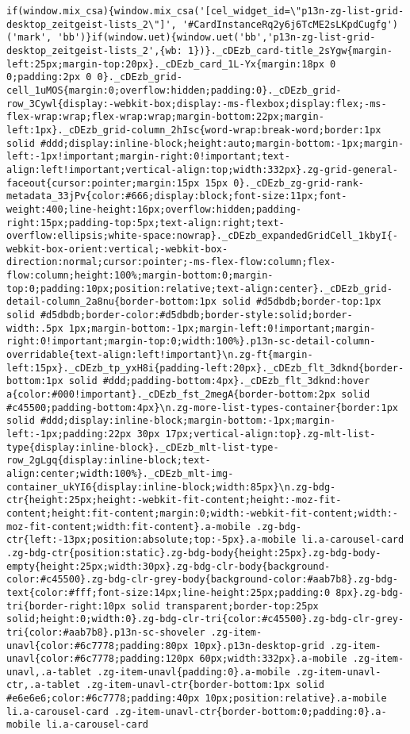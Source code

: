 \documentclass[
]{article}
\begin{document}
\begin{verbatim}
if(window.mix_csa){window.mix_csa('[cel_widget_id=\"p13n-zg-list-grid-desktop_zeitgeist-lists_2\"]', '#CardInstanceRq2y6j6TcME2sLKpdCugfg')('mark', 'bb')}if(window.uet){window.uet('bb','p13n-zg-list-grid-desktop_zeitgeist-lists_2',{wb: 1})}._cDEzb_card-title_2sYgw{margin-left:25px;margin-top:20px}._cDEzb_card_1L-Yx{margin:18px 0 0;padding:2px 0 0}._cDEzb_grid-cell_1uMOS{margin:0;overflow:hidden;padding:0}._cDEzb_grid-row_3Cywl{display:-webkit-box;display:-ms-flexbox;display:flex;-ms-flex-wrap:wrap;flex-wrap:wrap;margin-bottom:22px;margin-left:1px}._cDEzb_grid-column_2hIsc{word-wrap:break-word;border:1px solid #ddd;display:inline-block;height:auto;margin-bottom:-1px;margin-left:-1px!important;margin-right:0!important;text-align:left!important;vertical-align:top;width:332px}.zg-grid-general-faceout{cursor:pointer;margin:15px 15px 0}._cDEzb_zg-grid-rank-metadata_33jPv{color:#666;display:block;font-size:11px;font-weight:400;line-height:16px;overflow:hidden;padding-right:15px;padding-top:5px;text-align:right;text-overflow:ellipsis;white-space:nowrap}._cDEzb_expandedGridCell_1kbyI{-webkit-box-orient:vertical;-webkit-box-direction:normal;cursor:pointer;-ms-flex-flow:column;flex-flow:column;height:100%;margin-bottom:0;margin-top:0;padding:10px;position:relative;text-align:center}._cDEzb_grid-detail-column_2a8nu{border-bottom:1px solid #d5dbdb;border-top:1px solid #d5dbdb;border-color:#d5dbdb;border-style:solid;border-width:.5px 1px;margin-bottom:-1px;margin-left:0!important;margin-right:0!important;margin-top:0;width:100%}.p13n-sc-detail-column-overridable{text-align:left!important}\n.zg-ft{margin-left:15px}._cDEzb_tp_yxH8i{padding-left:20px}._cDEzb_flt_3dknd{border-bottom:1px solid #ddd;padding-bottom:4px}._cDEzb_flt_3dknd:hover a{color:#000!important}._cDEzb_fst_2megA{border-bottom:2px solid #c45500;padding-bottom:4px}\n.zg-more-list-types-container{border:1px solid #ddd;display:inline-block;margin-bottom:-1px;margin-left:-1px;padding:22px 30px 17px;vertical-align:top}.zg-mlt-list-type{display:inline-block}._cDEzb_mlt-list-type-row_2gLgq{display:inline-block;text-align:center;width:100%}._cDEzb_mlt-img-container_ukYI6{display:inline-block;width:85px}\n.zg-bdg-ctr{height:25px;height:-webkit-fit-content;height:-moz-fit-content;height:fit-content;margin:0;width:-webkit-fit-content;width:-moz-fit-content;width:fit-content}.a-mobile .zg-bdg-ctr{left:-13px;position:absolute;top:-5px}.a-mobile li.a-carousel-card .zg-bdg-ctr{position:static}.zg-bdg-body{height:25px}.zg-bdg-body-empty{height:25px;width:30px}.zg-bdg-clr-body{background-color:#c45500}.zg-bdg-clr-grey-body{background-color:#aab7b8}.zg-bdg-text{color:#fff;font-size:14px;line-height:25px;padding:0 8px}.zg-bdg-tri{border-right:10px solid transparent;border-top:25px solid;height:0;width:0}.zg-bdg-clr-tri{color:#c45500}.zg-bdg-clr-grey-tri{color:#aab7b8}.p13n-sc-shoveler .zg-item-unavl{color:#6c7778;padding:80px 10px}.p13n-desktop-grid .zg-item-unavl{color:#6c7778;padding:120px 60px;width:332px}.a-mobile .zg-item-unavl,.a-tablet .zg-item-unavl{padding:0}.a-mobile .zg-item-unavl-ctr,.a-tablet .zg-item-unavl-ctr{border-bottom:1px solid #e6e6e6;color:#6c7778;padding:40px 10px;position:relative}.a-mobile li.a-carousel-card .zg-item-unavl-ctr{border-bottom:0;padding:0}.a-mobile li.a-carousel-card 
\end{verbatim}
\end{document}

